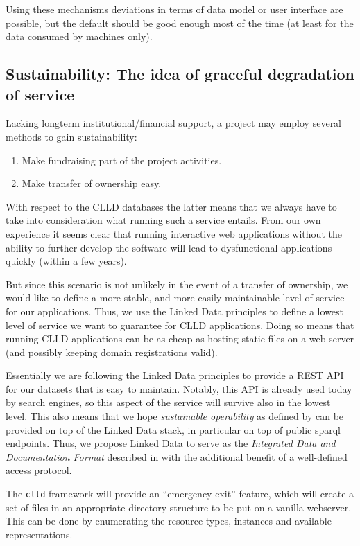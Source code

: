 \documentclass[a4paper,10pt]{article}
\begin{document}
Using these mechanisms deviations in terms of data model or user interface are possible, but the default 
should be good enough most of the time (at least for the data consumed by machines only).

\subsection{Sustainability: The idea of graceful degradation of service}
\label{sec:sustainability}
Lacking longterm institutional/financial support, a project may employ several methods to gain sustainability:
\begin{enumerate}
\item Make fundraising part of the project activities.
\item Make transfer of ownership easy.
\end{enumerate}

With respect to the CLLD databases the latter means that we always have to take into consideration what running such a service
entails. From our own experience it seems clear that running interactive web applications without the ability to further develop 
the software will lead to dysfunctional applications quickly (within a few years).

But since this scenario is not unlikely in the event of a transfer of ownership, we would like to define a more stable, and more easily
maintainable level of service for our applications. Thus, we use the Linked Data principles to define a lowest level of service we
want to guarantee for CLLD applications. Doing so means that running CLLD applications can be as cheap as hosting static files on a
web server (and possibly keeping domain registrations valid).

Essentially we are following the Linked Data principles to provide a REST API for our datasets that is easy to maintain. Notably, this API is already used today by search engines, so this aspect of the service will survive also in the lowest level. This also means that we hope \emph{sustainable operability} as defined by  can be provided on top of the Linked Data stack, in particular on top of public sparql endpoints. Thus, we propose Linked Data to serve as the \emph{Integrated Data and Documentation Format} described in  with the additional benefit of a well-defined access protocol.

The \texttt{clld} framework will provide an ``emergency exit'' feature, which will create a set of files in an appropriate
directory structure to be put on a vanilla webserver. This can be done by enumerating the resource types, instances and
available representations.
\end{document}

